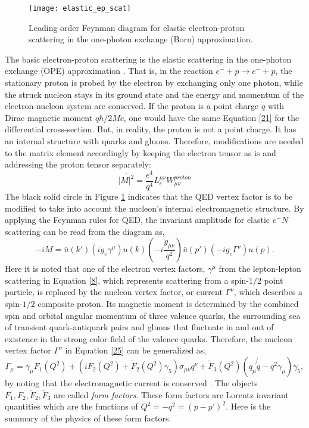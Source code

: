 \begin{figure}[htbp]
\centering
\mbox{\texttt{[image: elastic\_ep\_scat]}}
\caption{Leading order Feynman diagram for elastic electron-proton scattering in the one-photon exchange (Born) approximation.}
\label{fig3}
\end{figure}
\vspace{0.50cm}
The basic electron-proton scattering is the elastic scattering in the one-photon exchange (OPE) approximation \cite{7}. That is, in the reaction $e^-+p \rightarrow e^-+p$, the stationary proton is probed by the electron by exchanging only one photon, while the struck nucleon stays in its ground state and the energy and momentum of the electron-nucleon system are conserved. If the proton is a point charge $q$ with Dirac magnetic moment $q\hbar/2Mc$, one would have the same Equation \eqref{21} for the differential cross-section. But, in reality, the proton is not a point charge. It has an internal structure with quarks and gluons. Therefore, modifications are needed to the matrix element accordingly by keeping the electron tensor as is and addressing the proton tensor separately:
\begin{equation}
\label{24}
\bar{{|M|}^2}=\frac{e^4}{q^4} L_e^{\mu \nu} W_{\mu \nu}^{proton}
\end {equation}
The black solid circle in Figure \ref{fig3} indicates that the QED vertex factor is to be modified to take into account the nucleon's internal electromagnetic structure. By applying the Feynman rules for QED, the invariant amplitude for elastic $e^-N$ scattering can be read from the  diagram as,
\begin{equation}
\label{25}
-iM=\bar{u}(k')(ig_e\gamma ^\mu)u(k)\left(-i\frac {g_{\mu \nu}} {q^2} \right)\bar{u}(p')(-ig_e\Gamma ^\nu) u(p).
\end{equation}
Here it is noted that one of the electron vertex factors, $ \gamma ^\mu$ from the lepton-lepton scattering in Equation \eqref{8}, which represents scattering from a spin-$1/2$ point particle, is replaced by the nucleon vertex factor, or current $\Gamma ^\nu$, which describes a spin-$1/2$ composite proton. Its magnetic moment is determined by the combined spin and orbital angular momentum of three valence quarks, the surrounding sea of transient quark-antiquark pairs and gluons that fluctuate in and out of existence in the strong color field of the valence quarks. Therefore, the nucleon vertex factor $\Gamma^{\nu}$ in Equation \eqref{25} can be generalized as,
\begin{equation}
\label{2-1}
\Gamma_{\mu}=\gamma_\mu F_1(Q^2)+(iF_2(Q^2)+\tilde{F}_2(Q^2)\gamma_5)\sigma_{\mu \nu}q^{\nu}+\tilde{F}_3(Q^2)(q_\mu\not{q}-q^2 \gamma_\mu) \gamma_5,
\end{equation}
by noting that the electromagnetic current is conserved \cite{15}. The objects $F_1, F_2, \tilde{F}_2, \tilde{F}_3$ are called \emph{form factors}. These form factors are Lorentz invariant quantities which are the functions of $Q^2=-q^2=(p-p')^2$. Here is the summary of the physics of these form factors.

